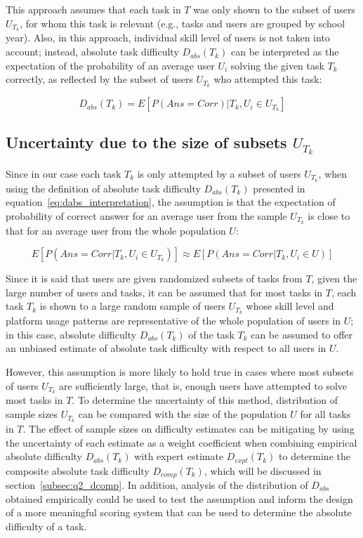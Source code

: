 This approach assumes that each task in $T$ was only shown to the subset of users $U_{T_k}$, for whom this task is relevant (e.g., tasks and users are grouped by school year).
Also, in this approach, individual skill level of users is not taken into account;
instead, absolute task difficulty $D_{abs}(T_k)$ can be interpreted as the expectation of the probability of an average user $U_i$ solving the given task $T_k$ correctly, as reflected by the subset of users $U_{T_k}$ who attempted this task:

\begin{equation} \label{eq:dabs_interpretation}
    D_{abs}(T_k) = E[P(Ans=Corr)|T_k, U_i \in U_{T_k}]
\end{equation}

\subsection{Uncertainty due to the size of subsets $U_{T_k}$} \label{subsec:q1_dabs_uncertainty}

Since in our case each task $T_k$ is only attempted by a subset of users $U_{T_k}$, when using the definition of absolute task difficulty $D_{abs}(T_k)$ presented in equation~\ref{eq:dabs_interpretation}, the assumption is that the expectation of probability of correct answer for an average user from the sample $U_{T_k}$ is close to that for an average user from the whole population $U$:

\begin{equation} \label{eq:dabs_assumption}
    E[P(Ans=Corr|T_k, U_i \in U_{T_k})] \approx E[P(Ans=Corr|T_k, U_i \in U)]
\end{equation}


Since it is said that users are given randomized subsets of tasks from $T$, given the large number of users and tasks, it can be assumed that for most tasks in $T$, each task $T_k$ is shown to a large random sample of users $U_{T_k}$ whose skill level and platform usage patterns are representative of the whole population of users in $U$;
in this case, absolute difficulty $D_{abs}(T_k)$ of the task $T_k$ can be assumed to offer an unbiased estimate of absolute task difficulty with respect to all users in $U$.

However, this assumption is more likely to hold true in cases where most subsets of users $U_{T_k}$ are sufficiently large, that is, enough users have attempted to solve most tasks in $T$.
To determine the uncertainty of this method, distribution of sample sizes $U_{T_k}$ can be compared with the size of the population $U$ for all tasks in $T$.
The effect of sample sizes on difficulty estimates can be mitigating by using the uncertainty of each estimate as a weight coefficient when combining empirical absolute difficulty $D_{abs}(T_k)$ with expert estimate $D_{expt}(T_k)$ to determine the composite absolute task difficulty $D_{comp}(T_k)$, which will be discussed in section~\ref{subsec:q2_dcomp}.
In addition, analysis of the distribution of $D_{abs}$ obtained empirically could be used to test the assumption and inform the design of a more meaningful scoring system that can be used to determine the absolute difficulty of a task.

